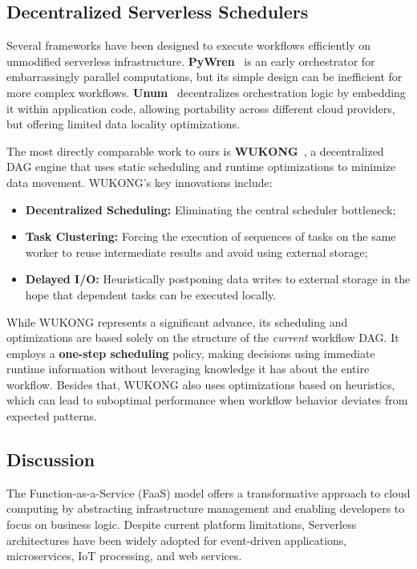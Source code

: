 \documentclass[conference]{IEEEtran}
\begin{document}
\subsection{Decentralized Serverless Schedulers}
Several frameworks have been designed to execute workflows efficiently on unmodified serverless infrastructure. \textbf{PyWren}~\cite{pywren} is an early orchestrator for embarrassingly parallel computations, but its simple design can be inefficient for more complex workflows. \textbf{Unum}~\cite{unum_decentralized_orchestrator} decentralizes orchestration logic by embedding it within application code, allowing portability across different cloud providers, but offering limited data locality optimizations.

The most directly comparable work to ours is \textbf{WUKONG}~\cite{wukong_2}, a decentralized DAG engine that uses static scheduling and runtime optimizations to minimize data movement. WUKONG's key innovations include:
\begin{itemize}
    \item \textbf{Decentralized Scheduling:} Eliminating the central scheduler bottleneck;
    \item \textbf{Task Clustering:} Forcing the execution of sequences of tasks on the same worker to reuse intermediate results and avoid using external storage;
    \item \textbf{Delayed I/O:} Heuristically postponing data writes to external storage in the hope that dependent tasks can be executed locally.
\end{itemize}

While WUKONG represents a significant advance, its scheduling and optimizations are based solely on the structure of the \textit{current} workflow DAG. It employs a \textbf{one-step scheduling} policy, making decisions using immediate runtime information without leveraging knowledge it has about the entire workflow. Besides that, WUKONG also uses optimizations based on heuristics, which can lead to suboptimal performance when workflow behavior deviates from expected patterns.

\subsection{Discussion}
The Function-as-a-Service (FaaS) model offers a transformative approach to cloud computing by abstracting infrastructure management and enabling developers to focus on business logic. Despite current platform limitations, Serverless architectures have been widely adopted for event-driven applications, microservices, IoT processing, and web services.
\end{document}
